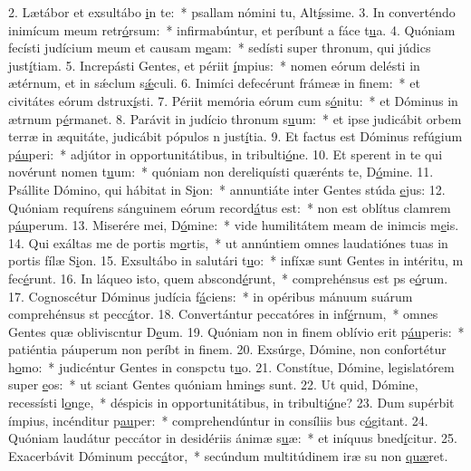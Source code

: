 2. Lætábor et exsultábo \uline{i}n te:~* psallam nómini tu, Alt\uline{í}ssime.
3. In converténdo inimícum meum retr\uline{ó}rsum:~* infirmabúntur, et períbunt a fáce t\uline{u}a.
4. Quóniam fecísti judícium meum et causam m\uline{e}am:~* sedísti super thronum, qui júdics just\uline{í}tiam.
5. Increpásti Gentes, et périit \uline{í}mpius:~* nomen eórum delésti in ætérnum, et in sǽclum s\uline{ǽ}culi.
6. Inimíci defecérunt frámeæ in f\uline{i}nem:~* et civitátes eórum dstrux\uline{í}sti.
7. Périit memória eórum cum s\uline{ó}nitu:~* et Dóminus in ætrnum p\uline{é}rmanet.
8. Parávit in judício thronum s\uline{u}um:~* et ipse judicábit orbem terræ in æquitáte, judicábit pópulos n just\uline{í}tia.
9. Et factus est Dóminus refúgium p\uline{áu}peri:~* adjútor in opportunitátibus, in tribulti\uline{ó}ne.
10. Et sperent in te qui novérunt nomen t\uline{u}um:~* quóniam non dereliquísti quærénts te, D\uline{ó}mine.
11. Psállite Dómino, qui hábitat in S\uline{i}on:~* annuntiáte inter Gentes stúda \uline{e}jus:
12. Quóniam requírens sánguinem eórum record\uline{á}tus est:~* non est oblítus clamrem p\uline{áu}perum.
13. Miserére mei, D\uline{ó}mine:~* vide humilitátem meam de inimcis m\uline{e}is.
14. Qui exáltas me de portis m\uline{o}rtis,~* ut annúntiem omnes laudatiónes tuas in portis fílæ S\uline{i}on.
15. Exsultábo in salutári t\uline{u}o:~* infíxæ sunt Gentes in intéritu, m fec\uline{é}runt.
16. In láqueo isto, quem abscond\uline{é}runt,~* comprehénsus est ps e\uline{ó}rum.
17. Cognoscétur Dóminus judícia f\uline{á}ciens:~* in opéribus mánuum suárum comprehénsus st pecc\uline{á}tor.
18. Convertántur peccatóres in inf\uline{é}rnum,~* omnes Gentes quæ obliviscntur D\uline{e}um.
19. Quóniam non in finem oblívio erit p\uline{áu}peris:~* patiéntia páuperum non períbt in f\uline{i}nem.
20. Exsúrge, Dómine, non confortétur h\uline{o}mo:~* judicéntur Gentes in conspctu t\uline{u}o.
21. Constítue, Dómine, legislatórem super \uline{e}os:~* ut sciant Gentes quóniam hmin\uline{e}s sunt.
22. Ut quid, Dómine, recessísti l\uline{o}nge,~* déspicis in opportunitátibus, in tribulti\uline{ó}ne?
23. Dum supérbit ímpius, incénditur p\uline{au}per:~* comprehendúntur in consíliis bus c\uline{ó}gitant.
24. Quóniam laudátur peccátor in desidériis ánimæ s\uline{u}æ:~* et iníquus bned\uline{í}citur.
25. Exacerbávit Dóminum pecc\uline{á}tor,~* secúndum multitúdinem iræ su non \uline{quæ}ret.
